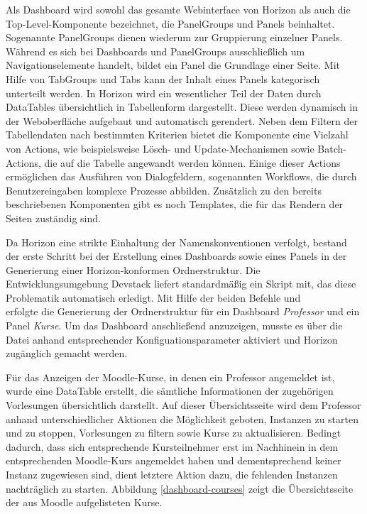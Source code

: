 Als Dashboard wird sowohl das gesamte Webinterface von Horizon als auch die Top-Level-Komponente bezeichnet, die PanelGroups und Panels beinhaltet. Sogenannte PanelGroups dienen wiederum zur Gruppierung einzelner Panels. Während es sich bei Dashboards und PanelGroups ausschließlich um Navigationselemente handelt, bildet ein Panel die Grundlage einer Seite. Mit Hilfe von TabGroups und Tabs kann der Inhalt eines Panels kategorisch unterteilt werden. In Horizon wird ein wesentlicher Teil der Daten durch DataTables übersichtlich in Tabellenform dargestellt. Diese werden dynamisch in der Weboberfläche aufgebaut und automatisch gerendert. Neben dem Filtern der Tabellendaten nach bestimmten Kriterien bietet die Komponente eine Vielzahl von Actions, wie beispielsweise Lösch- und Update-Mechanismen sowie Batch-Actions, die auf die Tabelle angewandt werden können. Einige dieser Actions ermöglichen das Ausführen von Dialogfeldern, sogenannten Workflows, die durch Benutzereingaben komplexe Prozesse abbilden. Zusätzlich zu den bereits beschriebenen Komponenten gibt es noch Templates, die für das Rendern der Seiten zuständig sind.

Da Horizon eine strikte Einhaltung der Namenskonventionen verfolgt, bestand der erste Schritt bei der Erstellung eines Dashboards sowie eines Panels in der Generierung einer Horizon-konformen Ordnerstruktur. Die Entwicklungsumgebung Devstack liefert standardmäßig ein Skript mit, das diese Problematik automatisch erledigt. Mit Hilfe der beiden Befehle  und  \\  erfolgte die Generierung der Ordnerstruktur für ein Dashboard \textit{Professor} und ein Panel \textit{Kurse}. Um das Dashboard anschließend anzuzeigen, musste es über die Datei  anhand entsprechender Konfiguationsparameter aktiviert und Horizon zugänglich gemacht werden.

Für das Anzeigen der Moodle-Kurse, in denen ein Professor angemeldet ist, wurde eine DataTable erstellt, die sämtliche Informationen der zugehörigen Vorlesungen übersichtlich darstellt. Auf dieser Übersichtsseite wird dem Professor anhand unterschiedlicher Aktionen die Möglichkeit geboten, Instanzen zu starten und zu stoppen, Vorlesungen zu filtern sowie Kurse zu aktualisieren. Bedingt dadurch, dass sich entsprechende Kursteilnehmer erst im Nachhinein in dem entsprechenden Moodle-Kurs angemeldet haben und dementsprechend keiner Instanz zugewiesen sind, dient letztere Aktion dazu, die fehlenden Instanzen nachträglich zu starten. Abbildung \ref{dashboard-courses} zeigt die Übersichtsseite der aus Moodle aufgelisteten Kurse.

